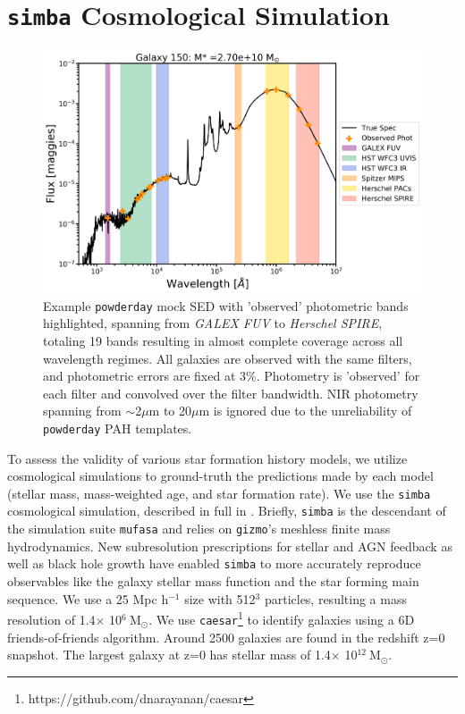 \documentclass[twocolumn]{aastex62}
\begin{document}
\section{\texttt{simba} Cosmological Simulation} 
\label{section:simulations}

\begin{figure}
    \centering
    \includegraphics[width = \textwidth]{fancySED_150.png}
    \caption{Example \texttt{powderday} mock SED with 'observed' photometric bands highlighted, spanning from \textit{GALEX FUV} to \textit{Herschel SPIRE}, totaling 19 bands resulting in almost complete coverage across all wavelength regimes. All galaxies are observed with the same filters, and photometric errors are fixed at $3\%$. Photometry is 'observed' for each filter and convolved over the filter bandwidth. NIR photometry spanning from $\sim$2$\mu$m to 20$\mu$m is ignored due to the unreliability of \texttt{powderday} PAH templates.}
    \label{fig:SED}
\end{figure}

To assess the validity of various star formation history models, we utilize cosmological simulations to ground-truth the predictions made by each model (stellar mass, mass-weighted age, and star formation rate). We use the \texttt{simba} cosmological simulation, described in full in \cite{dave_simba:_2019}. Briefly, \texttt{simba} is the descendant of the simulation suite \texttt{mufasa} and relies on \texttt{gizmo}'s meshless finite mass hydrodynamics. New subresolution prescriptions for stellar and AGN feedback as well as black hole growth have enabled \texttt{simba} to more accurately reproduce observables like the galaxy stellar mass function and the star forming main sequence. We use a 25 Mpc h$^{-1}$ size with 512$^3$ particles, resulting a mass resolution of 1.4$\times$ 10$^6 \: \mathrm{M}_{\odot}$. We use \texttt{caesar}\footnote{https://github.com/dnarayanan/caesar} to identify galaxies using a 6D friends-of-friends algorithm. Around 2500 galaxies are found in the redshift z=0 snapshot. The largest galaxy at z=0 has stellar mass of 1.4$\times$ 10$^{12} \: \mathrm{M}_{\odot}$. 
\end{document}
